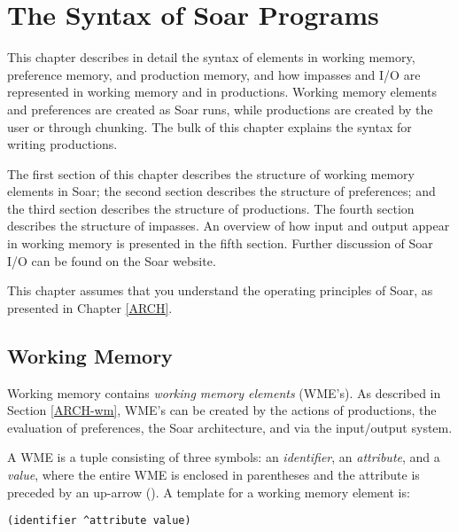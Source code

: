 \chapter{The Syntax of Soar Programs}
\label{SYNTAX}

This chapter describes in detail the syntax of elements in working
memory, preference memory, and production memory, and how impasses and
I/O are represented in working memory and in productions. Working memory
elements and preferences are created as Soar runs, while productions are
created by the user or through chunking. The bulk of this chapter
explains the syntax for writing productions.

The first section of this chapter describes the structure of working
memory elements in Soar; the second section describes the structure of
preferences; and the third section describes the structure of
productions. The fourth section describes the structure of impasses.
An overview of how input and output appear in working memory is
presented in the fifth section. Further discussion of Soar I/O can be found
on the Soar website.

This chapter assumes that you understand the operating principles of
Soar, as presented in Chapter \ref{ARCH}.

\section{Working Memory}
\label{SYNTAX-wm}

Working memory contains \emph{working memory elements} (WME's). As
described in Section \ref{ARCH-wm}, WME's can be created by the actions of 
productions, the evaluation of preferences, the Soar
architecture, and via the input/output system.

A WME is a tuple consisting of three symbols: an {\em identifier}, an
\emph{attribute}, and a \emph{value}, where the entire WME is enclosed in
parentheses and the attribute is preceded by an up-arrow (\carat ).
A template for a working memory element is:
\begin{verbatim}
(identifier ^attribute value)
\end{verbatim}

